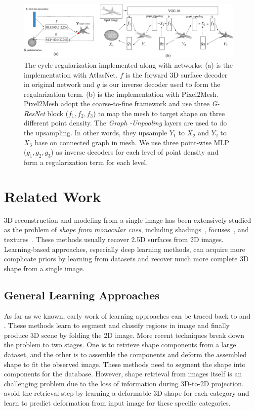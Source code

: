 \begin{figure}[htbp]
	\centering
	\includegraphics[width=\linewidth]{img/net/net}
	\caption{The cycle regularization implemented along with networks: (a) is the implementation with AtlasNet\cite{atlasnet}. $f$ is the forward 3D surface decoder in original network and $g$ is our inverse decoder used to form the regularization term. (b) is the implementation with Pixel2Mesh\cite{pixel2mesh}.  Pixel2Mesh\cite{pixel2mesh} adopt the coarse-to-fine framework and use three \emph{G-ResNet} block ($f_1,f_2,f_3$) to map the mesh to target shape on three different point density. The \emph{Graph -Unpooling} layers are used to do the upsampling. In other words, they upsample $Y_1$ to $X_2$ and $Y_2$ to $X_3$ base on connected graph in mesh. We use three point-wise MLP ($g_1,g_2,g_3$) as inverse decoders for each level of point density and form a regularization term for each level.}
	\label{fig:net}
\end{figure}
\section{Related Work}
3D reconstruction and modeling from a single image has been extensively studied as the problem of \emph{shape from monocular cues}, including shadings~\cite{shapefromshadingsurvey}, focuses~\cite{shapefromdf1,shapefromdf2}, and textures~\cite{Aloimonos1988}. 
These methods usually recover 2.5D surfaces from 2D images. 
Learning-based approaches, especially deep learning methods, can acquire more complicate priors by learning from datasets and recover much more complete 3D shape from a single image.
 
\subsection{General Learning Approaches}
As far as we known, early work of learning approaches can be traced back to \cite{Hoiem2007} and \cite{learn3D2007}. These methods learn to segment and classify regions in image and finally produce 3D scene by folding the 2D image.
%
More recent techniques break down the problem to two stages\cite{Su:2014,jointimgshape}. One is to retrieve shape components from a large dataset, and the other is to assemble the components and deform the assembled shape to fit the observed image. These methods need to segment the shape into components for the database.
%
However, shape retrieval from images itself is an challenging problem due to the loss of information during 3D-to-2D projection. 
\cite{imgrecon15} avoid the retrieval step by learning a deformable 3D shape for each category and learn to predict deformation from input image for these specific categories.
%
